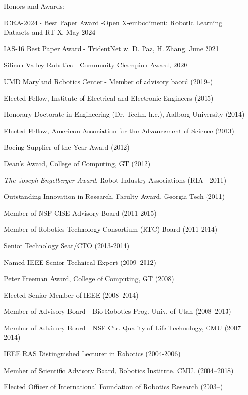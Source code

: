 \documentclass{article}
\newenvironment{sublist}{%
  \begin{list}{}{%
      \setlength{\itemsep}{0em}\setlength{\parsep}{0em}%
      \setlength{\topsep}{0em}\setlength{\parskip}{0em}%
    }%
}%
{ \end{list} }
\begin{document}
\begin{cv}
\begin{cvlist}{Honors and Awards:}
\item ICRA-2024 - Best Paper Award -Open X-embodiment: Robotic Learning Datasets and RT-X, May 2024
\item IAS-16 Best Paper Award - TridentNet w. D. Paz, H. Zhang, June 2021
\item Silicon Valley Robotics - Community Champion Award, 2020
\item UMD Maryland Robotics Center - Member of advisory baord (2019--)
\item Elected Fellow, Institute of Electrical and Electronic Engineers (2015)
\item Honorary Doctorate in Engineering (Dr. Techn. h.c.), Aalborg University (2014)
\item Elected Fellow, American Association for the Advancement of Science (2013)
\item Boeing Supplier of the Year Award (2012)
\item Dean's Award, College of Computing, GT (2012)
\item {\em The Joseph Engelberger Award}, Robot Industry Associations (RIA - 2011)
\item Outstanding Innovation in Research, Faculty Award, Georgia Tech (2011)
\item Member of NSF CISE Advisory Board (2011-2015)
\item Member of Robotics Technology Consortium (RTC) Board (2011-2014)
  \begin{sublist}
  \item Senior Technology Seat/CTO (2013-2014)
  \end{sublist}
\item Named IEEE Senior Technical Expert (2009--2012)
\item Peter Freeman Award, College of Computing, GT (2008)
\item Elected Senior Member of IEEE (2008--2014)
\item Member of Advisory Board - Bio-Robotics Prog. Univ. of Utah (2008--2013)
\item Member of Advisory Board - NSF Ctr. Quality of Life Technology,
  CMU (2007--2014)
\item IEEE RAS Distinguished Lecturer in Robotics (2004-2006)
\item Member of Scientific Advisory Board, Robotics Institute, CMU.  (2004--2018)
\item Elected Officer of International Foundation of Robotics Research
  (2003--)

\end{cvlist}
\end{cv}
\end{document}
